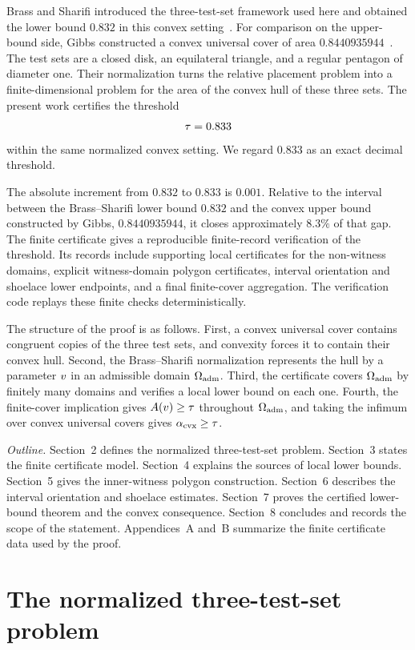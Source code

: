 \documentclass[11pt]{article}
\begin{document}
Brass and Sharifi introduced the three-test-set framework used here and obtained the lower bound \(0.832\) in this convex setting~\cite{brass-sharifi}.  For comparison on the upper-bound side, Gibbs constructed a convex universal cover of area \(0.8440935944\)~\cite{gibbs}.  The test sets are a closed disk, an equilateral triangle, and a regular pentagon of diameter one.  Their normalization turns the relative placement problem into a finite-dimensional problem for the area of the convex hull of these three sets.  The present work certifies the threshold
\[
\tau=0.833
\]
within the same normalized convex setting.  We regard \(0.833\) as an exact decimal threshold.

The absolute increment from \(0.832\) to \(0.833\) is \(0.001\).  Relative to the interval between the Brass--Sharifi lower bound \(0.832\) and the convex upper bound constructed by Gibbs, \(0.8440935944\), it closes approximately \(8.3\%\) of that gap.  The finite certificate gives a reproducible finite-record verification of the threshold.  Its records include supporting local certificates for the non-witness domains, explicit witness-domain polygon certificates, interval orientation and shoelace lower endpoints, and a final finite-cover aggregation.  The verification code replays these finite checks deterministically.

The structure of the proof is as follows.  First, a convex universal cover contains congruent copies of the three test sets, and convexity forces it to contain their convex hull.  Second, the Brass--Sharifi normalization represents the hull by a parameter \(v\) in an admissible domain \(\Omega_{\mathrm{adm}}\).  Third, the certificate covers \(\Omega_{\mathrm{adm}}\) by finitely many domains and verifies a local lower bound on each one.  Fourth, the finite-cover implication gives \(A(v)\ge\tau\) throughout \(\Omega_{\mathrm{adm}}\), and taking the infimum over convex universal covers gives \(\alpha_{\mathrm{cvx}}\ge\tau\).

\emph{Outline.} Section~2 defines the normalized three-test-set problem.  Section~3 states the finite certificate model.  Section~4 explains the sources of local lower bounds.  Section~5 gives the inner-witness polygon construction.  Section~6 describes the interval orientation and shoelace estimates.  Section~7 proves the certified lower-bound theorem and the convex consequence.  Section~8 concludes and records the scope of the statement.  Appendices~A and~B summarize the finite certificate data used by the proof.

\section{The normalized three-test-set problem}
\end{document}
